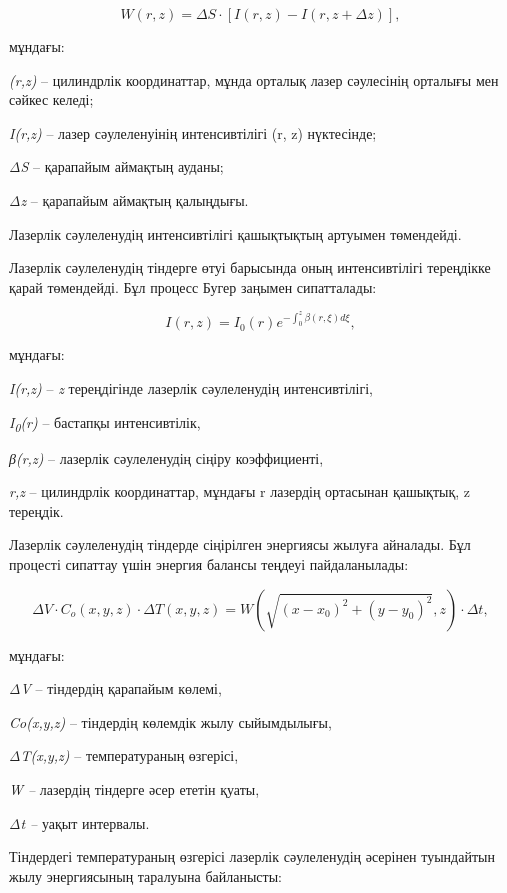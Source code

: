 \begin{equation}
W(r,z) = \Delta S \cdot \left\lbrack I(r,z) - I(r,z + \Delta z) \right\rbrack,
\end{equation}

\begin{multicols}{2}
мұндағы:

\emph{(r,z)} -- цилиндрлік координаттар, мұнда орталық лазер сәулесінің
орталығы мен сәйкес келеді;

\emph{I(r,z)} -- лазер сәулеленуінің интенсивтілігі (r, z) нүктесінде;

\emph{ΔS} -- қарапайым аймақтың ауданы;

\emph{Δz} -- қарапайым аймақтың қалыңдығы.

Лазерлік сәулеленудің интенсивтілігі қашықтықтың артуымен төмендейді.

Лазерлік сәулеленудің тіндерге өтуі барысында оның интенсивтілігі
тереңдікке қарай төмендейді. Бұл процесс Бугер заңымен сипатталады:
\end{multicols}

\begin{equation}
I(r,z) = I_{0}(r)e^{- \int_{0}^{z}{\beta(r,\xi)d\xi}},
\end{equation}

\begin{multicols}{2}
мұндағы:

\emph{I(r,z)} -- \emph{z} тереңдігінде лазерлік сәулеленудің
интенсивтілігі,

\emph{I\textsubscript{0}(r)} -- бастапқы интенсивтілік,

\emph{β(r,z)} -- лазерлік сәулеленудің сіңіру коэффициенті,

\emph{r,z} -- цилиндрлік координаттар, мұндағы r лазердің ортасынан
қашықтық, z тереңдік.

Лазерлік сәулеленудің тіндерде сіңірілген энергиясы жылуға айналады. Бұл
процесті сипаттау үшін энергия балансы теңдеуі пайдаланылады:
\end{multicols}

\begin{equation}
\Delta V \cdot C_{o}(x,y,z) \cdot \Delta T(x,y,z) = W\left( \sqrt{\left( x - x_{0} \right)^{2} + \left( y - y_{0} \right)^{2}},z \right) \cdot \Delta t,
\end{equation}

\begin{multicols}{2}
мұндағы:

\emph{ΔV} -- тіндердің қарапайым көлемі,

\emph{Co(x,y,z)} -- тіндердің көлемдік жылу сыйымдылығы,

\emph{ΔT(x,y,z)} -- температураның өзгерісі,

\emph{W --} лазердің тіндерге әсер ететін қуаты,

\emph{Δt --} уақыт интервалы.

Тіндердегі температураның өзгерісі лазерлік сәулеленудің әсерінен
туындайтын жылу энергиясының таралуына байланысты:
\end{multicols}

